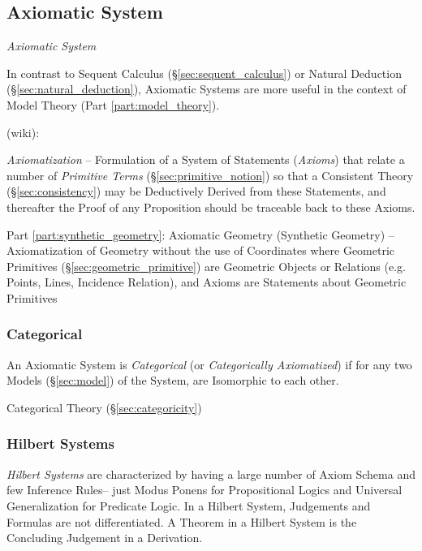 \subsection{Axiomatic System} \label{sec:axiomatic_system}

\emph{Axiomatic System}

In contrast to Sequent Calculus (\S\ref{sec:sequent_calculus}) or Natural
Deduction (\S\ref{sec:natural_deduction}), Axiomatic Systems are more useful in
the context of Model Theory (Part \ref{part:model_theory}).

(wiki):

\emph{Axiomatization} -- Formulation of a System of Statements (\emph{Axioms})
that relate a number of \emph{Primitive Terms} (\S\ref{sec:primitive_notion}) so
that a Consistent Theory (\S\ref{sec:consistency}) may be Deductively Derived
from these Statements, and thereafter the Proof of any Proposition should be
traceable back to these Axioms.

\fist Part \ref{part:synthetic_geometry}: Axiomatic Geometry (Synthetic
Geometry) -- Axiomatization of Geometry without the use of Coordinates where
Geometric Primitives (\S\ref{sec:geometric_primitive}) are Geometric Objects or
Relations (e.g. Points, Lines, Incidence Relation), and Axioms are Statements
about Geometric Primitives



\subsubsection{Categorical}\label{sec:categorical}

An Axiomatic System is \emph{Categorical} (or \emph{Categorically
  Axiomatized}) if for any two Models (\S\ref{sec:model}) of the
System, are Isomorphic to each other.

Categorical Theory (\S\ref{sec:categoricity})



\subsubsection{Hilbert Systems}\label{sec:hilbert_system}

\emph{Hilbert Systems} are characterized by having a large number of
Axiom Schema and few Inference Rules-- just Modus Ponens for
Propositional Logics and Universal Generalization for Predicate
Logic. In a Hilbert System, Judgements and Formulas are not
differentiated. A Theorem in a Hilbert System is the Concluding
Judgement in a Derivation.

